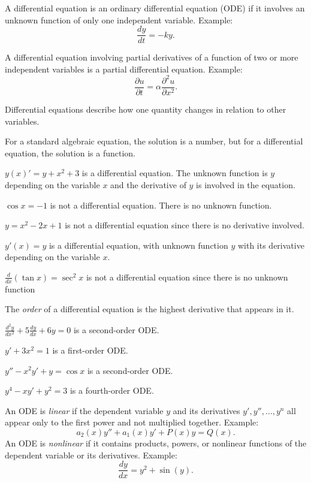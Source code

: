 A diﬀerential equation is an ordinary diﬀerential equation (ODE) if it involves an unknown function of only one independent variable.
Example: 
    \[
    \frac{dy}{dt} = -ky.
    \]

A differential equation involving partial derivatives of a function of two or more independent variables is a partial differential equation. 
Example:
    \[
    \frac{\partial u}{\partial t} = \alpha \frac{\partial^2 u}{\partial x^2}.
    \]

Differential equations describe how one quantity changes in relation to other variables.

For a standard algebraic equation, the solution is a number, but for a differential equation, the solution is a function.
\begin{compactitem}
    \item \(y(x)' = y + x^2 +3\) is a diﬀerential equation. The unknown function is \( y\)depending on the variable \(x\) and the derivative of \(y\) is involved in the equation.
    \item \(\cos{x} = -1\) is not a diﬀerential equation. There is no unknown function.
    \item \(y = x^2 -2x +1\) is not a differential equation since there is no derivative involved.
    \item \(y'(x) = y\) is a differential equation, with unknown function \(y\) with its derivative depending on the variable \(x\).
    \item \(\frac{d}{dx}(\tan{x}) = \sec^2{x}\) is not a differential equation since there is no unknown function
\end{compactitem}

\begin{definition}
    The \emph{order} of a differential equation is the highest derivative that appears in it. 
\end{definition}
\begin{compactitem}
    \item \(\frac{d^2y}{dx^2} + 5 \frac{dy}{dx} + 6y = 0\) is a second-order ODE.
    \item \(y' + 3x^2 =1\) is a first-order ODE.
    \item \(y'' - x^2y' + y = \cos{x}\) is a second-order ODE.
    \item \(y^{4} - xy' + y^2 = 3\) is a fourth-order ODE.
\end{compactitem}


\begin{definition}[Linearity]
    An ODE is \emph{linear} if the dependent variable \(y\) and its derivatives \(y',y'',\ldots,y^n\)  all appear only to the first power and not multiplied together.  
        Example: 
        \[
        a_2(x)y'' + a_1(x)y' + P(x)y = Q(x).
        \]
    An ODE is \emph{nonlinear} if it contains products, powers, or nonlinear functions of the dependent variable or its derivatives.  
        Example:
        \[
        \frac{dy}{dx} = y^2 + \sin(y).
        \]
\end{definition}

